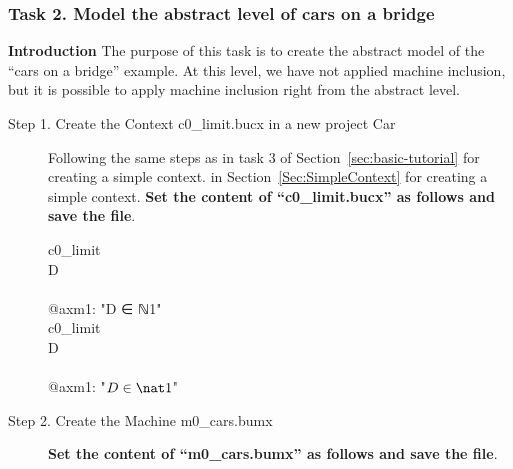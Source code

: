 \subsubsection{Task 2. Model the abstract level of cars on a bridge}
\textbf{Introduction} The purpose of this task is to create the abstract model of the ``cars on a bridge'' example. At this level, we have not applied machine inclusion, but it is possible to apply machine inclusion right from the abstract level. 
\begin{description}
	\item[Step 1. Create the Context c0\_limit.bucx in a new project Car] 
	Following the same steps as 
	\ifplastex
	in task 3 of Section~\ref{sec:basic-tutorial} for creating a simple context.  
	\else
	in Section~\ref{Sec:SimpleContext} for creating a simple context.
	\fi
	\textbf{Set the content of ``c0\_limit.bucx'' as follows and save the file}.
	  
	  \begin{center}
		\begin{Bcode}
			\ifplastex
			\Bcontext{} c0_limit\\
			\Bconstants{} D\\
			\Baxioms\\
			@axm1: "D ∈ ℕ1"\\
			\Bend
			\else
			\Bcontext{} c0_limit\\
			\Bconstants{} D\\
			\Baxioms\\
			\Btab @axm1: "\(D \in \nat1\)"\\
			\Bend
			\fi
		\end{Bcode}
	\end{center}
	\item[Step 2. Create the Machine m0\_cars.bumx]\textbf{Set the content of ``m0\_cars.bumx'' as follows and save the file}.


\end{description}
